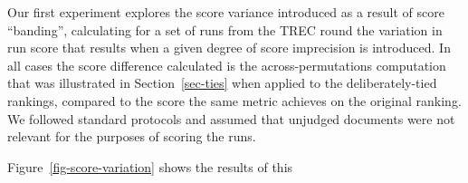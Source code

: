 Our first experiment explores the score variance introduced as a
result of score ``banding'', calculating for a set of runs
from the {} TREC round the variation in run score
that results when a given degree of score imprecision is introduced.
In all cases the score difference calculated is the
across-permutations computation that was illustrated in
Section~\ref{sec-ties} when applied to the deliberately-tied
rankings, compared to the score the same metric achieves on the
original ranking.
We followed standard protocols and assumed that unjudged documents
were not relevant for the purposes of scoring the runs.

Figure~\ref{fig-score-variation} shows the results of this
{} 

